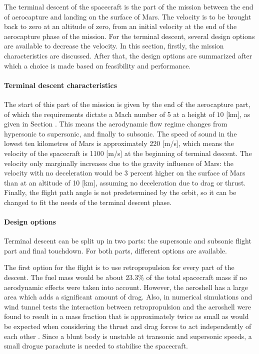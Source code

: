 The terminal descent of the spacecraft is the part of the mission between the end of aerocapture and landing on the surface of Mars. The velocity is to be brought back to zero at an altitude of zero, from an initial velocity at the end of the aerocapture phase of the mission. For the terminal descent, several design options are available to decrease the velocity. In this section, firstly, the mission characteristics are discussed. After that, the design options are summarized after which a choice is made based on feasibility and performance.

\paragraph{Terminal descent characteristics}
The start of this part of the mission is given by the end of the aerocapture part, of which the requirements dictate a Mach number of 5 at a height of $10$ [km], as given in Section \label{sec:missionreq}. This means the aerodynamic flow regime changes from hypersonic to supersonic, and finally to subsonic. The speed of sound in the lowest ten kilometres of Mars is approximately 220 [m/s], which means the velocity of the spacecraft is 1100 [m/s] at the beginning of terminal descent. The velocity only marginally increases due to the gravity influence of Mars: the velocity with no deceleration would be 3 percent higher on the surface of Mars than at an altitude of 10 [km], assuming no deceleration due to drag or thrust. Finally, the flight path angle is not predetermined by the orbit, so it can be changed to fit the needs of the terminal descent phase.

\paragraph{Design options}
Terminal descent can be split up in two parts: the supersonic and subsonic flight part and final touchdown. For both parts, different options are available.

The first option for the flight is to use retropropulsion for every part of the descent. The fuel mass would be about 23.3$\%$ of the total spacecraft mass if no aerodynamic effects were taken into account. However, the aeroshell has a large area which adds a significant amount of drag. Also, in numerical simulations and wind tunnel tests the interaction between retropropulsion and the aeroshell were found to result in a mass fraction that is approximately twice as small as would be expected when considering the thrust and drag forces to act independently of each other \cite{Korzun2009a}. Since a blunt body is unstable at transonic and supersonic speeds, a small drogue parachute is needed to stabilise the spacecraft.

